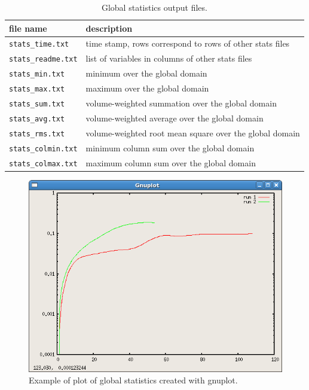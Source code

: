 \begin{table}[ht] 
\caption{Global statistics output files.}
\vspace{0.5cm} \centering 
\begin{tabular}{ll} 
\hline\hline file name & description  \\
\hline 
\verb|stats_time.txt| & time stamp, rows correspond to rows of other stats files \\
\verb|stats_readme.txt| & list of variables in columns of other stats files \\
\verb|stats_min.txt| & minimum over the global domain \\
\verb|stats_max.txt| & maximum over the global domain \\
\verb|stats_sum.txt| & volume-weighted summation over the global domain \\
\verb|stats_avg.txt| & volume-weighted average over the global domain \\
\verb|stats_rms.txt| & volume-weighted root mean square over the global domain \\
\verb|stats_colmin.txt| & minimum column sum over the global domain \\
\verb|stats_colmax.txt| & maximum column sum over the global domain \\
\hline 
\end{tabular} \label{oceanTable:global statistics} 
\end{table}

\begin{figure}[H]
	\centering
	\includegraphics[scale=0.5]{ocean/figures/gnuplot.png}
	\caption{Example of plot of global statistics created with gnuplot.}
	\label{fig:gnuplot}
\end{figure}

